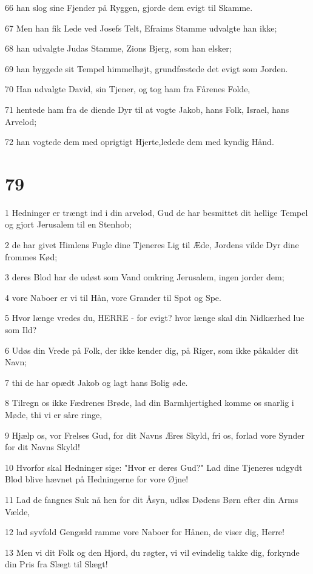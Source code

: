 \par 66 han slog sine Fjender på Ryggen, gjorde dem evigt til Skamme.
\par 67 Men han fik Lede ved Josefs Telt, Efraims Stamme udvalgte han ikke;
\par 68 han udvalgte Judas Stamme, Zions Bjerg, som han elsker;
\par 69 han byggede sit Tempel himmelhøjt, grundfæstede det evigt som Jorden.
\par 70 Han udvalgte David, sin Tjener, og tog ham fra Fårenes Folde,
\par 71 hentede ham fra de diende Dyr til at vogte Jakob, hans Folk, Israel, hans Arvelod;
\par 72 han vogtede dem med oprigtigt Hjerte,ledede dem med kyndig Hånd.

\chapter{79}

\par 1 Hedninger er trængt ind i din arvelod, Gud de har besmittet dit hellige Tempel og gjort Jerusalem til en Stenhob;
\par 2 de har givet Himlens Fugle dine Tjeneres Lig til Æde, Jordens vilde Dyr dine frommes Kød;
\par 3 deres Blod har de udøst som Vand omkring Jerusalem, ingen jorder dem;
\par 4 vore Naboer er vi til Hån, vore Grander til Spot og Spe.
\par 5 Hvor længe vredes du, HERRE - for evigt? hvor længe skal din Nidkærhed lue som Ild?
\par 6 Udøs din Vrede på Folk, der ikke kender dig, på Riger, som ikke påkalder dit Navn;
\par 7 thi de har opædt Jakob og lagt hans Bolig øde.
\par 8 Tilregn os ikke Fædrenes Brøde, lad din Barmhjertighed komme os snarlig i Møde, thi vi er såre ringe,
\par 9 Hjælp os, vor Frelses Gud, for dit Navns Æres Skyld, fri os, forlad vore Synder for dit Navns Skyld!
\par 10 Hvorfor skal Hedninger sige: "Hvor er deres Gud?" Lad dine Tjeneres udgydt Blod blive hævnet på Hedningerne for vore Øjne!
\par 11 Lad de fangnes Suk nå hen for dit Åsyn, udløs Dødens Børn efter din Arms Vælde,
\par 12 lad syvfold Gengæld ramme vore Naboer for Hånen, de viser dig, Herre!
\par 13 Men vi dit Folk og den Hjord, du røgter, vi vil evindelig takke dig, forkynde din Pris fra Slægt til Slægt!

